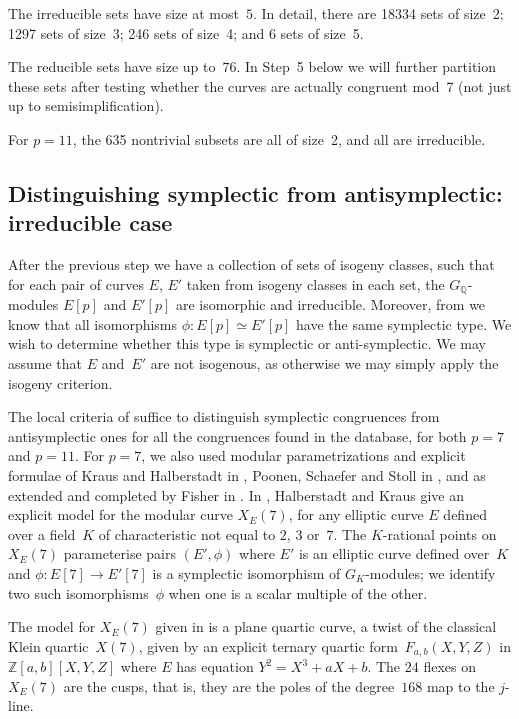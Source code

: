 \documentclass[12pt]{amsart}
\newcommand{\Q}{\mathbb{Q}}
\newcommand{\Z}{\mathbb{Z}}
\numberwithin{equation}{section}
\theoremstyle{definition}
\theoremstyle{remark}
\begin{document}
The irreducible sets have size at most~$5$.  In detail, there are
18334 sets of size~2; 1297 sets of size~3; 246 sets of size~4; and 6
sets of size~5.

The reducible sets have size up to~$76$.  In Step~5 below we will
further partition these sets after testing whether the curves are
actually congruent mod~7 (not just up to semisimplification).


For $p=11$, the 635 nontrivial subsets are all of size~2, and
all are irreducible.


\subsection{Distinguishing symplectic from antisymplectic: irreducible case}
After the previous step we have a collection of sets of isogeny
classes, such that for each pair of curves $E$, $E'$ taken from
isogeny classes in each set, the $G_{\Q}$-modules $E[p]$ and $E'[p]$
are isomorphic and irreducible. Moreover, from
\cite[Corollary~3]{FKSym} we know that all isomorphisms $\phi : E[p]
\simeq E'[p]$ have the same symplectic type. We wish to determine
whether this type is symplectic or anti-symplectic.  We may assume
that $E$ and~$E'$ are not isogenous, as otherwise we may simply apply
the isogeny criterion.

The local criteria of \cite{FKSym} suffice to distinguish symplectic
congruences from antisymplectic ones for all the congruences found in
the database, for both $p=7$ and $p=11$.  For $p=7$, we also used
modular parametrizations and explicit formulae of Kraus and
Halberstadt in \cite{Halberstadt-Kraus-XE7}, Poonen, Schaefer and
Stoll in \cite{PSS}, and as extended and completed by Fisher in
\cite{Fisher}.  In \cite{Halberstadt-Kraus-XE7}, Halberstadt and Kraus
give an explicit model for the modular curve $X_E(7)$, for any
elliptic curve $E$ defined over a field~$K$ of characteristic not
equal to $2$, $3$ or~$7$. The $K$-rational points on $X_E(7)$
parameterise pairs $(E',\phi)$ where $E'$ is an elliptic curve defined
over~$K$ and $\phi:E[7]\to E'[7]$ is a symplectic isomorphism of
$G_K$-modules; we  identify two such isomorphisms~$\phi$ when one
  is a scalar multiple of the other.

The model for $X_E(7)$ given in \cite{Halberstadt-Kraus-XE7} is a
plane quartic curve, a twist of the classical Klein quartic~$X(7)$,
given by an explicit ternary quartic form~$F_{a,b}(X,Y,Z)$ in
$\Z[a,b][X,Y,Z]$ where $E$ has equation $Y^2=X^3+aX+b$.  The $24$
flexes on $X_E(7)$ are the cusps, that is, they are the poles of the
degree~$168$ map to the $j$-line.
\end{document}
